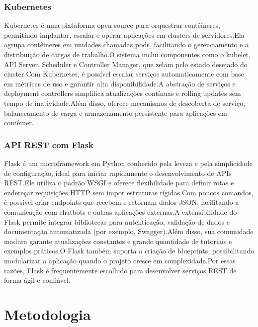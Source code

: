 \subsection{Kubernetes}
Kubernetes é uma plataforma open source para orquestrar contêineres, permitindo implantar, escalar e operar aplicações em clusters de servidores.Ela agrupa contêineres em unidades chamadas pods, facilitando o gerenciamento e a distribuição de cargas de trabalho.O sistema inclui componentes como o kubelet, API Server, Scheduler e Controller Manager, que zelam pelo estado desejado do cluster.Com Kubernetes, é possível escalar serviços automaticamente com base em métricas de uso e garantir alta disponibilidade.A abstração de serviços e deployment controllers simplifica atualizações contínuas e rolling updates sem tempo de inatividade.Além disso, oferece mecanismos de descoberta de serviço, balanceamento de carga e armazenamento persistente para aplicações em contêiner.\cite{kubernetes2025overview}

\subsection{API REST com Flask}
Flask é um microframework em Python conhecido pela leveza e pela simplicidade de configuração, ideal para iniciar rapidamente o desenvolvimento de APIs REST.Ele utiliza o padrão WSGI e oferece flexibilidade para definir rotas e endereçar requisições HTTP sem impor estruturas rígidas.Com poucos comandos, é possível criar endpoints que recebem e retornam dados JSON, facilitando a comunicação com chatbots e outras aplicações externas.A extensibilidade do Flask permite integrar bibliotecas para autenticação, validação de dados e documentação automatizada (por exemplo, Swagger).Além disso, sua comunidade madura garante atualizações constantes e grande quantidade de tutoriais e exemplos práticos.O Flask também suporta a criação de blueprints, possibilitando modularizar a aplicação quando o projeto cresce em complexidade.Por essas razões, Flask é frequentemente escolhido para desenvolver serviços REST de forma ágil e confiável\cite{flask2024}.



\chapter{Metodologia}
\label{chap:metodologia}

